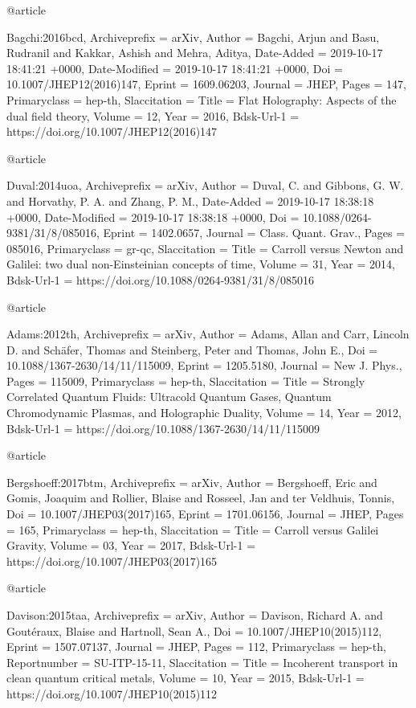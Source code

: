 \documentclass[superscriptaddress,prd,nofootinbib,preprintnumbers,longbibliography,11pt,eqsecnum]{revtex4-1}
\begin{document}
{{{{{{{{{{@article{Bagchi:2016bcd,
	Archiveprefix = {arXiv},
	Author = {Bagchi, Arjun and Basu, Rudranil and Kakkar, Ashish and Mehra, Aditya},
	Date-Added = {2019-10-17 18:41:21 +0000},
	Date-Modified = {2019-10-17 18:41:21 +0000},
	Doi = {10.1007/JHEP12(2016)147},
	Eprint = {1609.06203},
	Journal = {JHEP},
	Pages = {147},
	Primaryclass = {hep-th},
	Slaccitation = {Title = {{Flat Holography: Aspects of the dual field theory}},
	Volume = {12},
	Year = {2016},
	Bdsk-Url-1 = {https://doi.org/10.1007/JHEP12(2016)147}}

@article{Duval:2014uoa,
	Archiveprefix = {arXiv},
	Author = {Duval, C. and Gibbons, G. W. and Horvathy, P. A. and Zhang, P. M.},
	Date-Added = {2019-10-17 18:38:18 +0000},
	Date-Modified = {2019-10-17 18:38:18 +0000},
	Doi = {10.1088/0264-9381/31/8/085016},
	Eprint = {1402.0657},
	Journal = {Class. Quant. Grav.},
	Pages = {085016},
	Primaryclass = {gr-qc},
	Slaccitation = {Title = {{Carroll versus Newton and Galilei: two dual non-Einsteinian concepts of time}},
	Volume = {31},
	Year = {2014},
	Bdsk-Url-1 = {https://doi.org/10.1088/0264-9381/31/8/085016}}

@article{Adams:2012th,
	Archiveprefix = {arXiv},
	Author = {Adams, Allan and Carr, Lincoln D. and Sch{\"a}fer, Thomas and Steinberg, Peter and Thomas, John E.},
	Doi = {10.1088/1367-2630/14/11/115009},
	Eprint = {1205.5180},
	Journal = {New J. Phys.},
	Pages = {115009},
	Primaryclass = {hep-th},
	Slaccitation = {Title = {{Strongly Correlated Quantum Fluids: Ultracold Quantum Gases, Quantum Chromodynamic Plasmas, and Holographic Duality}},
	Volume = {14},
	Year = {2012},
	Bdsk-Url-1 = {https://doi.org/10.1088/1367-2630/14/11/115009}}

@article{Bergshoeff:2017btm,
	Archiveprefix = {arXiv},
	Author = {Bergshoeff, Eric and Gomis, Joaquim and Rollier, Blaise and Rosseel, Jan and ter Veldhuis, Tonnis},
	Doi = {10.1007/JHEP03(2017)165},
	Eprint = {1701.06156},
	Journal = {JHEP},
	Pages = {165},
	Primaryclass = {hep-th},
	Slaccitation = {Title = {{Carroll versus Galilei Gravity}},
	Volume = {03},
	Year = {2017},
	Bdsk-Url-1 = {https://doi.org/10.1007/JHEP03(2017)165}}

@article{Davison:2015taa,
	Archiveprefix = {arXiv},
	Author = {Davison, Richard A. and Gout\'eraux, Blaise and Hartnoll, Sean A.},
	Doi = {10.1007/JHEP10(2015)112},
	Eprint = {1507.07137},
	Journal = {JHEP},
	Pages = {112},
	Primaryclass = {hep-th},
	Reportnumber = {SU-ITP-15-11},
	Slaccitation = {Title = {{Incoherent transport in clean quantum critical metals}},
	Volume = {10},
	Year = {2015},
	Bdsk-Url-1 = {https://doi.org/10.1007/JHEP10(2015)112}}

}}}}}}}}}}}}}}}
\end{document}
